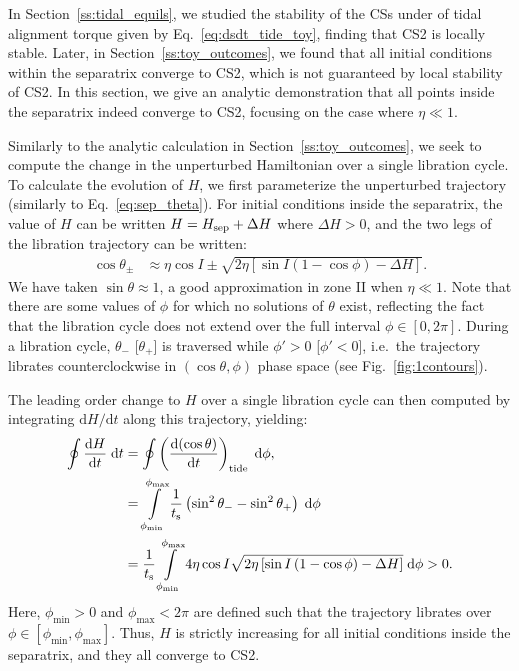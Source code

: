 \documentclass[
        fleqn,
        usenatbib,
    ]{mnras}
\newcommand*{\rd}[2]{\frac{\mathrm{d}#1}{\mathrm{d}#2}}
\newcommand*{\rdil}[2]{\mathrm{d}#1/\mathrm{d}#2}
\newcommand*{\p}[1]{\left(#1\right)}
\newcommand*{\s}[1]{\left[#1\right]}
\begin{document}
In Section~\ref{ss:tidal_equils}, we studied the stability of the CSs under of
tidal alignment torque given by Eq.~\eqref{eq:dsdt_tide_toy}, finding that CS2
is locally stable. Later, in Section~\ref{ss:toy_outcomes}, we found that all
initial conditions within the separatrix converge to CS2, which is not
guaranteed by local stability of CS2. In this section, we give an analytic
demonstration that all points inside the separatrix indeed converge to CS2,
focusing on the case where $\eta \ll 1$.

Similarly to the analytic calculation in Section~\ref{ss:toy_outcomes}, we seek
to compute the change in the unperturbed Hamiltonian over a single libration
cycle. To calculate the evolution of $H$, we first parameterize the unperturbed
trajectory (similarly to Eq.~\ref{eq:sep_theta}). For initial conditions inside
the separatrix, the value of $H$ can be written $H = H_{\rm sep} + \Delta H$
where $\Delta H > 0$, and the two legs of the libration trajectory can be
written:
\begin{align}
    \cos \theta_{\pm} &\approx
        \eta \cos I \pm \sqrt{2\eta\s{\sin I\p{1 - \cos \phi} - \Delta H}}.
        \label{eq:lib_cycle_toy}
\end{align}
We have taken $\sin \theta \approx 1$, a good approximation in zone II when
$\eta \ll 1$. Note that there are some values of $\phi$ for which no solutions
of $\theta$ exist, reflecting the fact that the libration cycle does not extend
over the full interval $\phi \in [0, 2\pi]$. During a libration cycle,
$\theta_-$ [$\theta_+$] is traversed while $\phi' > 0$ [$\phi' < 0$], i.e.\ the
trajectory librates counterclockwise in $(\cos \theta, \phi)$ phase space (see
Fig.~\ref{fig:1contours}).

The leading order change to $H$ over a single libration cycle can then computed by
integrating $\rdil{H}{t}$ along this trajectory, yielding:
\begin{align}
    \oint \rd{H}{t}\;\mathrm{d}t
        &= \oint \p{\rd{(\cos \theta)}{t}}_{\rm tide}
            \;\mathrm{d}\phi,\nonumber\\
        &= \int\limits_{\phi_{\min}}^{\phi_{\max}}
                \frac{1}{t_{\rm s}}
                \p{\sin^2\theta_- - \sin^2\theta_+} \;\mathrm{d}\phi\nonumber\\
        &= \frac{1}{t_{\rm s}}
            \int\limits_{\phi_{\min}}^{\phi_{\max}}
                4\eta \cos I \sqrt{2\eta\s{\sin I\p{1 - \cos \phi} - \Delta H}}
                \;\mathrm{d}\phi > 0.
\end{align}
Here, $\phi_{\min} > 0$ and $\phi_{\max} < 2\pi$ are defined such that the
trajectory librates over $\phi \in \s{\phi_{\min}, \phi_{\max}}$. Thus, $H$ is
strictly increasing for all initial conditions inside the separatrix, and they
all converge to CS2.
\end{document}
